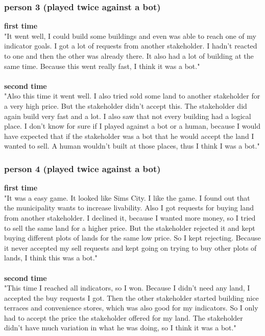 \subsubsection{person 3 (played twice against a bot)}
\textbf{first time}\\
"It went well, I could build some buildings and even was able to reach one of my indicator goals. I got a lot of requests from another stakeholder. I hadn't reacted to one and then the other was already there. It also had a lot of building at the same time. Because this went really fast, I think it was a bot."
\\ \\
\textbf{second time}\\
"Also this time it went well. I also tried sold some land to another stakeholder for a very high price. But the stakeholder didn't accept this. The stakeholder did again build very fast and a lot. I also saw that not every building had a logical place. I don't know for sure if I played against a bot or a human, because I would have expected that if the stakeholder was a bot that he would accept the land I wanted to sell. A human wouldn't built at those places, thus I think I was a bot." 

\subsubsection{person 4 (played twice against a bot)}
 \textbf{first time}\\
 "It was a easy game. It looked like Sims City. I like the game. I found out that the municipality wants to increase livability. Also I got requests for buying land from another stakeholder. I declined it, because I wanted more money, so I tried to sell the same land for a higher price. But the stakeholder rejected it and kept buying different plots of lands for the same low price. So I kept rejecting. Because it never accepted my sell requests and kept going on trying to buy other plots of lands, I think this was a bot." 
 \\ \\
 \textbf{second time}\\
 "This time I reached all indicators, so I won. Because I didn't need any land, I accepted the buy requests I got. Then the other stakeholder started building nice terraces and convenience stores, which was also good for my indicators. So I only had to accept the price the stakeholder offered for my land. The stakeholder didn't have much variation in what he was doing, so I think it was a bot."

